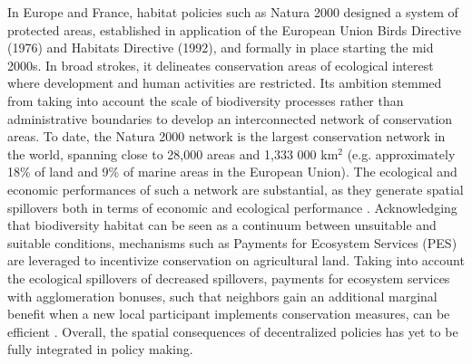 In Europe and France, habitat policies such as Natura 2000 designed a system of protected areas, established in application of the European Union Birds Directive (1976) and Habitats Directive (1992), and formally in place starting the mid 2000s. In broad strokes, it delineates conservation areas of ecological interest where development and human activities are restricted. Its ambition stemmed from taking into account the scale of biodiversity processes rather than administrative boundaries to develop an interconnected network of conservation areas. To date, the Natura 2000 network is the largest conservation network in the world, spanning close to 28,000 areas and 1,333 000 km$^2$ (e.g. approximately 18\% of land and 9\% of marine areas in the European Union). The ecological and economic performances of such a network are substantial, as they generate spatial spillovers both in terms of economic and ecological performance \citep{cocco_relaxing_2023}. Acknowledging that biodiversity habitat can be seen as a continuum between unsuitable and suitable conditions, mechanisms such as Payments for Ecosystem Services (PES) are leveraged to incentivize conservation on agricultural land. Taking into account the ecological spillovers of decreased spillovers, payments for ecosystem services with agglomeration bonuses, such that neighbors gain an additional marginal benefit when a new local participant implements conservation measures, can be efficient \citep{parkhurst2002agglomeration, bareille_agglomeration_2023}. Overall, the spatial consequences of decentralized policies has yet to be fully integrated in policy making.
\\

